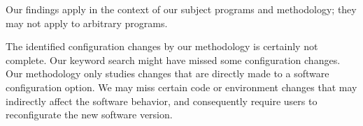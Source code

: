 Our findings apply in the context of our subject programs and methodology;
they may not apply to arbitrary programs.

The identified configuration changes by our methodology is certainly not complete.
Our keyword search might have missed some configuration changes.
Our methodology only studies changes that are directly made to a
software configuration option. We may miss certain
code or environment changes that may indirectly affect the software behavior,
and consequently require users to reconfigurate the new software version.




